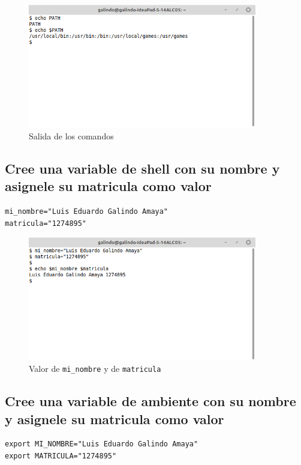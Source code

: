 \documentclass[11pt]{article}
\begin{document}
\begin{figure}[htbp]
\centering
\includegraphics[width=10cm]{img/4.png}
\caption{Salida de los comandos}
\end{figure}

\subsection{Cree una variable de shell con su nombre y asignele su matricula como valor}
\label{sec:org1b416f8}
\begin{verbatim}
mi_nombre="Luis Eduardo Galindo Amaya"
matricula="1274895"
\end{verbatim}

\begin{figure}[htbp]
\centering
\includegraphics[width=10cm]{img/5.png}
\caption[\texttt{matricula}]{Valor de \texttt{mi\_nombre} y de \texttt{matricula}}
\end{figure}

\pagebreak

\subsection{Cree una variable de ambiente con su nombre y asignele su matricula como valor}
\label{sec:orgc4906a0}
\begin{verbatim}
export MI_NOMBRE="Luis Eduardo Galindo Amaya"
export MATRICULA="1274895"
\end{verbatim}
\end{document}
